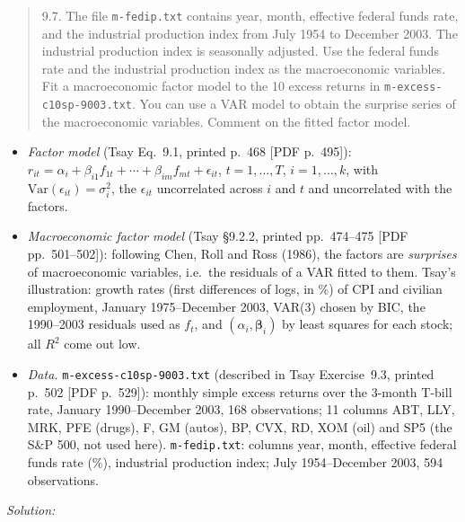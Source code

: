 \documentclass[11pt,a4paper]{article}
\newif\ifsolucoes
\newcommand{\espacoresol}{4.5cm}   %
\newenvironment{refmat}{\par\smallskip\noindent{\small\textbf{Referenced material.}}\begin{itemize}[leftmargin=1.4em,topsep=1pt,itemsep=1pt]\small}{\end{itemize}}
\newcommand{\resolespaco}{\ifsolucoes\else\par\textit{Solution:}\vspace{\espacoresol}\par\fi}
\begin{document}
\begin{quote}\small
9.7. The file \texttt{m-fedip.txt} contains year, month, effective federal funds rate, and the
industrial production index from July 1954 to December 2003. The industrial production index is
seasonally adjusted. Use the federal funds rate and the industrial production index as the
macroeconomic variables. Fit a macroeconomic factor model to the 10 excess returns in
\texttt{m-excess-c10sp-9003.txt}. You can use a VAR model to obtain the surprise series of the
macroeconomic variables. Comment on the fitted factor model.
\end{quote}
\begin{refmat}
\item \textit{Factor model} (Tsay Eq.~9.1, printed p.~468 [PDF p.~495]):
$r_{it}=\alpha_i+\beta_{i1}f_{1t}+\cdots+\beta_{im}f_{mt}+\epsilon_{it}$, $t=1,\dots,T$, $i=1,\dots,k$, with
$\mathrm{Var}(\epsilon_{it})=\sigma_i^2$, the $\epsilon_{it}$ uncorrelated across $i$ and $t$ and uncorrelated with the factors.
\item \textit{Macroeconomic factor model} (Tsay \S9.2.2, printed pp.~474--475 [PDF pp.~501--502]): following
Chen, Roll and Ross (1986), the factors are \emph{surprises} of macroeconomic variables, i.e.\ the residuals of a
VAR fitted to them. Tsay's illustration: growth rates (first differences of logs, in \%) of CPI and civilian
employment, January 1975--December 2003, VAR(3) chosen by BIC, the 1990--2003 residuals used as $f_t$, and
$(\alpha_i,\bm\beta_i)$ by least squares for each stock; all $R^2$ come out low.
\item \textit{Data.} \texttt{m-excess-c10sp-9003.txt} (described in Tsay Exercise~9.3, printed p.~502 [PDF p.~529]):
monthly simple excess returns over the 3-month T-bill rate, January 1990--December 2003, 168 observations;
11 columns ABT, LLY, MRK, PFE (drugs), F, GM (autos), BP, CVX, RD, XOM (oil) and SP5 (the S\&P 500, not used here).
\texttt{m-fedip.txt}: columns year, month, effective federal funds rate (\%), industrial production index;
July 1954--December 2003, 594 observations.
\end{refmat}
\resolespaco
\end{document}
